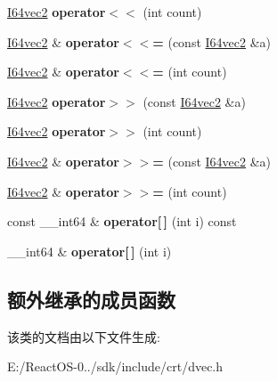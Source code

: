 \begin{DoxyCompactItemize}
\hyperlink{class_i64vec2}{I64vec2} {\bfseries operator$<$$<$} (int count)
\item 
\mbox{\label{class_i64vec2_aef029ee74a4f31b69bd21bca03b0252d}} 
\hyperlink{class_i64vec2}{I64vec2} \& {\bfseries operator$<$$<$=} (const \hyperlink{class_i64vec2}{I64vec2} \&a)
\item 
\mbox{\label{class_i64vec2_a8344d87e312666c98c044fa1b76d234d}} 
\hyperlink{class_i64vec2}{I64vec2} \& {\bfseries operator$<$$<$=} (int count)
\item 
\mbox{\label{class_i64vec2_a302cf57f9d2428f73293b02ec97d510e}} 
\hyperlink{class_i64vec2}{I64vec2} {\bfseries operator$>$$>$} (const \hyperlink{class_i64vec2}{I64vec2} \&a)
\item 
\mbox{\label{class_i64vec2_a4a6ca5877e5fced10c18f3c83c7dc058}} 
\hyperlink{class_i64vec2}{I64vec2} {\bfseries operator$>$$>$} (int count)
\item 
\mbox{\label{class_i64vec2_a097901a0f791d8afc7542eee9603c778}} 
\hyperlink{class_i64vec2}{I64vec2} \& {\bfseries operator$>$$>$=} (const \hyperlink{class_i64vec2}{I64vec2} \&a)
\item 
\mbox{\label{class_i64vec2_aab64236594ce051eb2e5d051cd72ca85}} 
\hyperlink{class_i64vec2}{I64vec2} \& {\bfseries operator$>$$>$=} (int count)
\item 
\mbox{\label{class_i64vec2_a6af8d4bc4e15c5879c763cd44f1f0be3}} 
const \+\_\+\+\_\+int64 \& {\bfseries operator\mbox{[}$\,$\mbox{]}} (int i) const
\item 
\mbox{\label{class_i64vec2_a9f041f710aa591d1dfc90b6cfd906451}} 
\+\_\+\+\_\+int64 \& {\bfseries operator\mbox{[}$\,$\mbox{]}} (int i)
\end{DoxyCompactItemize}
\subsection*{额外继承的成员函数}


该类的文档由以下文件生成\+:\begin{DoxyCompactItemize}
\item 
E\+:/\+React\+O\+S-\/0../sdk/include/crt/dvec.\+h\end{DoxyCompactItemize}
